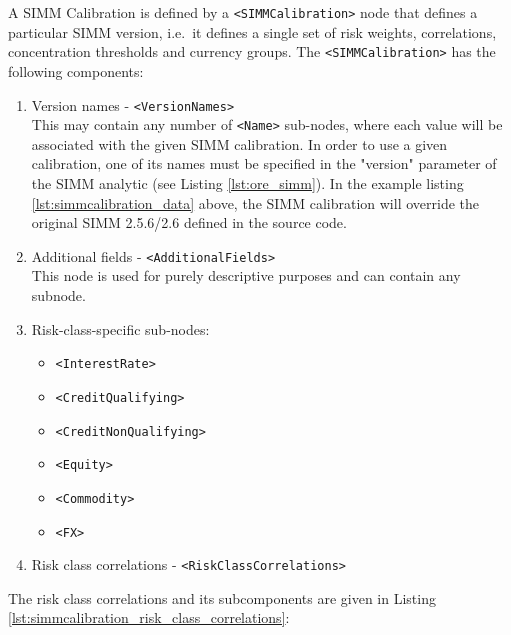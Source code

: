 A SIMM Calibration is defined by a {\tt <SIMMCalibration>} node that defines a particular SIMM version, i.e.\ it defines a single set of risk weights, correlations, concentration thresholds and currency groups. The {\tt <SIMMCalibration>} has the following components:

\begin{enumerate}
  \item Version names - {\tt <VersionNames>} \\
    This may contain any number of {\tt <Name>} sub-nodes, where each value will be associated with the given SIMM
    calibration. In order to use a given calibration, one of its names must be specified in the "version" parameter of the
    SIMM analytic (see Listing \ref{lst:ore_simm}). In the example listing \ref{lst:simmcalibration_data} above, the SIMM
    calibration will override the original SIMM 2.5.6/2.6 defined in the source code.
  \item Additional fields - {\tt <AdditionalFields>} \\
    This node is used for purely descriptive purposes and can contain any subnode.
  \item Risk-class-specific sub-nodes:
    \begin{itemize}
      \item {\tt <InterestRate>}
      \item {\tt <CreditQualifying>}
      \item {\tt <CreditNonQualifying>}
      \item {\tt <Equity>}
      \item {\tt <Commodity>}
      \item {\tt <FX>}
    \end{itemize}
  \item Risk class correlations - {\tt <RiskClassCorrelations>}
\end{enumerate}

The risk class correlations and its subcomponents are given in Listing \ref{lst:simmcalibration_risk_class_correlations}:

